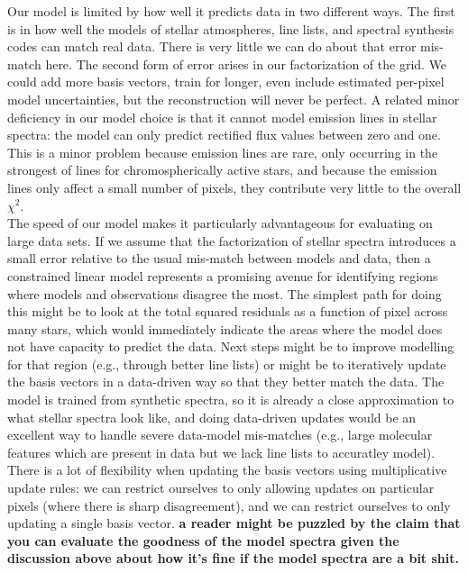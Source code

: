 \documentclass[modern]{aastex631}
\newcommand{\ajw}[1]{\textbf{#1}}
\begin{document}
Our model is limited by how well it predicts data in two different ways. The first is in how well the models of stellar atmospheres, line lists, and spectral synthesis codes can match real data. There is very little we can do about that error mis-match here. The second form of error arises in our factorization of the grid. We could add more basis vectors, train for longer, even include estimated per-pixel model uncertainties, but the reconstruction will never be perfect. A related minor deficiency in our model choice is that it cannot model emission lines in stellar spectra: the model can only predict rectified flux values between zero and one. This is a minor problem because emission lines are rare, only occurring in the strongest of lines for chromospherically active stars, and because the emission lines only affect a small number of pixels, they contribute very little to the overall $\chi^2$.\\

The speed of our model makes it particularly advantageous for evaluating on large data sets. If we assume that the factorization of stellar spectra introduces a small error relative to the usual mis-match between models and data, then a constrained linear model represents a promising avenue for identifying regions where models and observations disagree the most. The simplest path for doing this might be to look at the total squared residuals as a function of pixel across many stars, which would immediately indicate the areas where the model does not have capacity to predict the data. Next steps might be to improve modelling for that region (e.g., through better line lists) or might be to iteratively update the basis vectors in a data-driven way so that they better match the data. The model is trained from synthetic spectra, so it is already a close approximation to what stellar spectra look like, and doing data-driven updates would be an excellent way to handle severe data-model mis-matches (e.g., large molecular features which are present in data but we lack line lists to accuratley model). There is a lot of flexibility when updating the basis vectors using multiplicative update rules: we can restrict ourselves to only allowing updates on particular pixels (where there is sharp disagreement), and we can restrict ourselves to only updating a single basis vector. \ajw{a reader might be puzzled by the claim that you can evaluate the goodness of the model spectra given the discussion above about how it's fine if the model spectra are a bit shit.}\\
\end{document}
